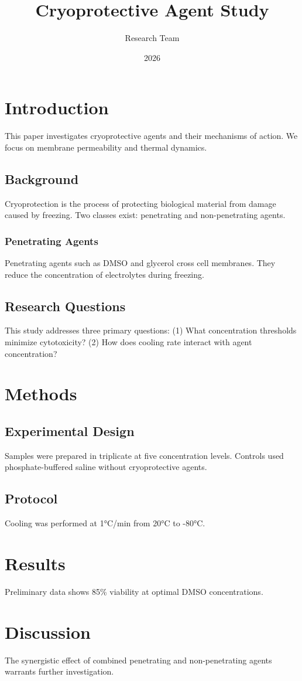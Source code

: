 \documentclass{article}
\title{Cryoprotective Agent Study}
\author{Research Team}
\date{2026}
\begin{document}
\maketitle

\section{Introduction}

This paper investigates cryoprotective agents and their mechanisms of action.
We focus on membrane permeability and thermal dynamics.

\subsection{Background}

Cryoprotection is the process of protecting biological material from damage caused by freezing.
Two classes exist: penetrating and non-penetrating agents.

\subsubsection{Penetrating Agents}

Penetrating agents such as DMSO and glycerol cross cell membranes.
They reduce the concentration of electrolytes during freezing.

\subsection{Research Questions}

This study addresses three primary questions:
(1) What concentration thresholds minimize cytotoxicity?
(2) How does cooling rate interact with agent concentration?

\section{Methods}

\subsection{Experimental Design}

Samples were prepared in triplicate at five concentration levels.
Controls used phosphate-buffered saline without cryoprotective agents.

\subsection{Protocol}

Cooling was performed at 1°C/min from 20°C to -80°C.

\section{Results}

Preliminary data shows 85\% viability at optimal DMSO concentrations.

\section{Discussion}

The synergistic effect of combined penetrating and non-penetrating agents
warrants further investigation.
\end{document}
